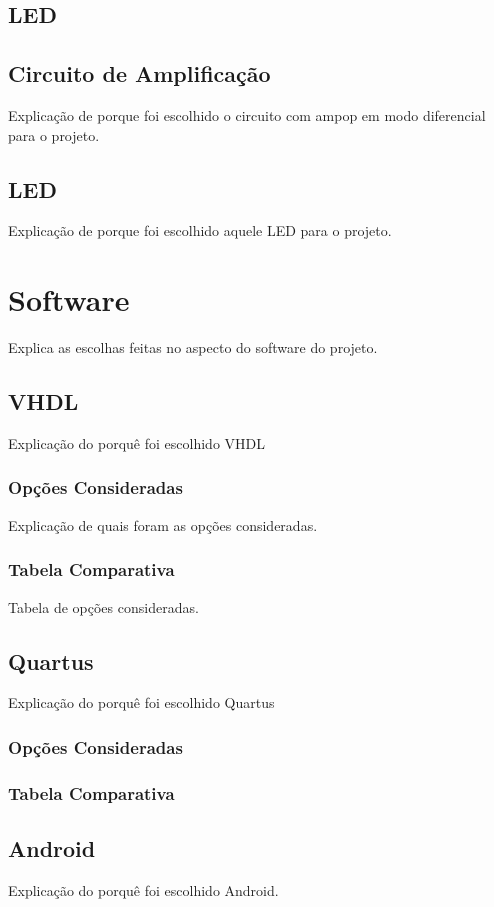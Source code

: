 	\lipsum[15]
	
	\subsection{LED}
	
	\lipsum[2]
	
	
	\subsection{Circuito de Amplificação}
	
	Explicação de porque foi escolhido o circuito com ampop em modo diferencial para o projeto.
	
	\subsection{LED}
	
	Explicação de porque foi escolhido aquele LED para o projeto.
	
	\section{Software}\label{sec-software}
	
	Explica as escolhas feitas no aspecto do software do projeto.
	
	\subsection{VHDL}
	
	Explicação do porquê foi escolhido VHDL
	
	\subsubsection{Opções Consideradas}\label{vhdl-opcoes}
	
	Explicação de quais foram as opções consideradas.
	
	\subsubsection{Tabela Comparativa}\label{vhdl-comparativo}
	
	Tabela de opções consideradas.
	
	
	\subsection{Quartus}
	
	Explicação do porquê foi escolhido Quartus
	
	\subsubsection{Opções Consideradas}\label{quartus-opcoes}
	
	\lipsum[10]
	
	\subsubsection{Tabela Comparativa}\label{quartus-comparativo}
	
	\lipsum[11]
	
	\subsection{Android}
	
	Explicação do porquê foi escolhido Android.
